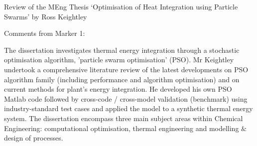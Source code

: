 \documentclass[14pt,twoside]{report}
\begin{document}
\vfill
\clearpage



\bigskip

\begin{center}
  {\Large Review of the MEng Thesis `Optimisation of Heat Integration using Particle Swarms' by Ross Keightley}
\end{center}
\noindent
{\Large Comments from Marker 1:}

The dissertation investigates thermal energy integration through a stochastic optimisation algorithm, 'particle swarm optimisation' (PSO). Mr Keightley undertook a comprehensive literature review of the latest developments on PSO algorithm family (including performance and algorithm optimisation) and on current methods for plant's energy integration. He developed his own PSO Matlab code followed by cross-code / cross-model validation (benchmark) using industry-standard test cases and applied the model to a synthetic thermal energy system. The dissertation encompass three main subject areas within Chemical Engineering: computational optimisation, thermal engineering and modelling $\&$ design of processes.
\end{document}
